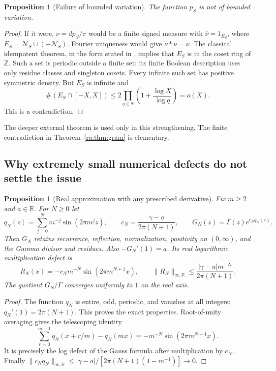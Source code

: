 \documentclass[11pt,a4paper]{article}
\newcommand{\Z}{\mathbb Z}
\newtheorem{proposition}[theorem]{Proposition}
\theoremstyle{definition}
\theoremstyle{remark}
\theoremstyle{plain}
\numberwithin{equation}{section}
\begin{document}
\begin{proposition}[Failure of bounded variation]\label{ra:prop:BV}
The function $p_S$ is not of bounded variation.
\end{proposition}
\begin{proof}
If it were, $\nu=dp_S/\pi$ would be a finite signed measure with
$\widehat\nu=1_{E_S}$, where $E_S=\mathcal N_S\cup(-\mathcal N_S)$.
Fourier uniqueness would give $\nu*\nu=\nu$. The classical idempotent
theorem, in the form stated in \cite[Theorem 1.1]{GreenSanders}, implies
that $E_S$ is in the coset ring of $\Z$. Such a set is periodic outside
a finite set: its finite Boolean description uses only residue
classes and singleton cosets. Every infinite such set has positive
symmetric density. But $E_S$ is infinite and
\[
 \#(E_S\cap[-X,X])\le
 2\prod_{q\in S}\left(1+\frac{\log X}{\log q}\right)=o(X).
\]
This is a contradiction.
\end{proof}

The deeper external theorem is used only in this strengthening.
The finite contradiction in Theorem~\ref{ra:thm:gram} is elementary.

\subsection{Why extremely small numerical defects do not settle the issue}

\begin{proposition}[Real approximation with any prescribed derivative]
\label{ra:prop:instability}
Fix $m\ge2$ and $a\in\mathbb R$. For $N\ge0$ let
\[
 q_N(z)=\sum_{j=0}^{N}m^{-j}\sin(2\pi m^jz),\qquad
 c_N=\frac{\gamma-a}{2\pi(N+1)},\qquad
 G_N(z)=\Gamma(z)e^{c_Nq_N(z)}.
\]
Then $G_N$ retains recurrence, reflection, normalization, positivity
on $(0,\infty)$, and the Gamma divisor and residues. Also
$-G_N'(1)=a$. Its real logarithmic multiplication defect is
\[
 R_N(x)=-c_Nm^{-N}\sin(2\pi m^{N+1}x),
 \qquad \|R_N\|_{\infty,\mathbb R}
 \le\frac{|\gamma-a|m^{-N}}{2\pi(N+1)}.
\]
The quotient $G_N/\Gamma$ converges uniformly to $1$ on the real axis.
\end{proposition}
\begin{proof}
The function $q_N$ is entire, odd, periodic, and vanishes at all
integers; $q_N'(1)=2\pi(N+1)$. This proves the exact properties.
Root-of-unity averaging gives the telescoping identity
\[
 \sum_{r=0}^{m-1}q_N(x+r/m)-q_N(mx)
 =-m^{-N}\sin(2\pi m^{N+1}x).
\]
It is precisely the log defect of the Gauss formula after multiplication
by $c_N$. Finally
$\|c_Nq_N\|_{\infty,\mathbb R}
\le |\gamma-a|/[2\pi(N+1)(1-m^{-1})]\to0$.
\end{proof}
\end{document}
